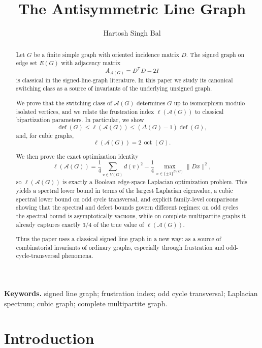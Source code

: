 \documentclass[11pt]{article}
\title{The Antisymmetric Line Graph}
\author{Hartosh Singh Bal}
\date{}
\theoremstyle{plain}
\begin{document}
\maketitle
\renewcommand{\thefootnote}{}
\renewcommand{\thefootnote}{\arabic{footnote}}

\begin{abstract}
Let $G$ be a finite simple graph with oriented incidence matrix $D$. The signed
graph on edge set $E(G)$ with adjacency matrix
\[
A_{\mathcal A(G)}=D^{\mathsf T}D-2I
\]
is classical in the signed-line-graph literature. In this paper we study its
canonical switching class as a source of invariants of the underlying unsigned
graph.

We prove that the switching class of $\mathcal A(G)$ determines $G$ up to
isomorphism modulo isolated vertices, and we relate the frustration index
$\ell(\mathcal A(G))$ to classical bipartization parameters. In particular, we
show
\[
\operatorname{def}(G)\le \ell(\mathcal A(G))\le (\Delta(G)-1)\operatorname{def}(G),
\]
and, for cubic graphs,
\[
\ell(\mathcal A(G))=2\,\operatorname{oct}(G).
\]

We then prove the exact optimization identity
\[
\ell(\mathcal A(G))
=
\frac14\sum_{v\in V(G)} d(v)^2
-\frac14\max_{x\in\{\pm1\}^{E(G)}}\|Dx\|^2,
\]
so $\ell(\mathcal A(G))$ is exactly a Boolean edge-space Laplacian optimization
problem. This yields a spectral lower bound in terms of the largest Laplacian
eigenvalue, a cubic spectral lower bound on odd cycle transversal, and explicit
family-level comparisons showing that the spectral and defect bounds govern
different regimes: on odd cycles the spectral bound is asymptotically vacuous,
while on complete multipartite graphs it already captures exactly $3/4$ of the
true value of $\ell(\mathcal A(G))$.

Thus the paper uses a classical signed line graph in a new way: as a
source of combinatorial invariants of ordinary graphs, especially through
frustration and odd-cycle-transversal phenomena.
\end{abstract}
\medskip
\noindent\textbf{Keywords.}
signed line graph; frustration index; odd cycle transversal;
Laplacian spectrum; cubic graph; complete multipartite graph.
\section{Introduction}
\end{document}
